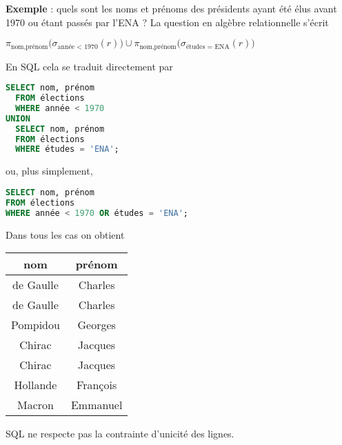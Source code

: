 \medskip

{\bf Exemple} : quels sont les noms et prénoms des présidents ayant été élus avant 1970 ou étant passés par l'ENA ?
La question en algèbre relationnelle s'écrit
\begin{center}
$\pi_{\text{nom,prénom}}\bigl(\sigma_{\text{année < 1970}}(r)\bigr) \cup \pi_{\text{nom,prénom}}\bigl(\sigma_{\text{études = ENA}}(r)\bigr)$
\end{center}
En SQL cela se traduit directement par
\begin{lstlisting}[language=SQL]
  SELECT nom, prénom
  FROM élections
  WHERE année < 1970
UNION
  SELECT nom, prénom
  FROM élections
  WHERE études = 'ENA';
\end{lstlisting}
ou, plus simplement,
\begin{lstlisting}[language=SQL]
SELECT nom, prénom
FROM élections
WHERE année < 1970 OR études = 'ENA';
\end{lstlisting}
Dans tous les cas on obtient
\begin{center}
\begin{tabular}{|c|c|}
\hline
{\bf nom} &{\bf prénom} \\
  \hline
de Gaulle & Charles \\
de Gaulle & Charles \\
Pompidou & Georges \\
Chirac &Jacques\\
Chirac &Jacques\\
Hollande &François\\
Macron &Emmanuel\\
\hline
\end{tabular}
\end{center}
SQL ne respecte pas la contrainte d'unicité des lignes. 


